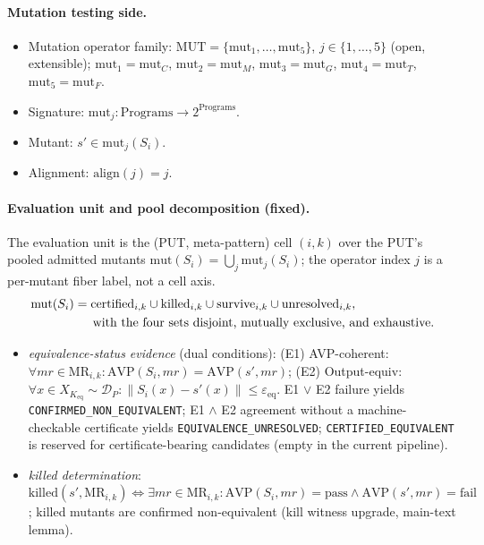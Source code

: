 \documentclass[manuscript,screen,review]{acmart}
\begin{document}
\paragraph{Mutation testing side.}
\begin{itemize}
\item Mutation operator family: $\mathrm{MUT} = \{\mathrm{mut}_1, \ldots, \mathrm{mut}_5\}$, $j \in \{1,\ldots,5\}$ (open, extensible); $\mathrm{mut}_1 = \mathrm{mut}_C$, $\mathrm{mut}_2 = \mathrm{mut}_M$, $\mathrm{mut}_3 = \mathrm{mut}_G$, $\mathrm{mut}_4 = \mathrm{mut}_T$, $\mathrm{mut}_5 = \mathrm{mut}_F$.
\item Signature: $\mathrm{mut}_j : \text{Programs} \to 2^{\text{Programs}}$.
\item Mutant: $s' \in \mathrm{mut}_j(S_i)$.
\item Alignment: $\mathrm{align}(j) = j$.
\end{itemize}

\paragraph{Evaluation unit and pool decomposition (fixed).}
The evaluation unit is the (PUT, meta-pattern) cell $(i,k)$ over the
PUT's pooled admitted mutants
$\mathrm{mut}(S_i) = \bigcup_j \mathrm{mut}_j(S_i)$; the operator index
$j$ is a per-mutant fiber label, not a cell axis.
\[
\begin{aligned}
\mathrm{mut}(S_i)
  &= \mathrm{certified}_{i,k} \cup \mathrm{killed}_{i,k}
     \cup \mathrm{survive}_{i,k} \cup \mathrm{unresolved}_{i,k},\\
&\hspace{1.5em}\text{with the four sets disjoint, mutually exclusive, and exhaustive.}
\end{aligned}
\]
\begin{itemize}
\item \emph{equivalence-status evidence} (dual conditions):
  (E1) AVP-coherent: $\forall \mathit{mr} \in \mathrm{MR}_{i,k}: \mathrm{AVP}(S_i, \mathit{mr}) = \mathrm{AVP}(s', \mathit{mr})$;
  (E2) Output-equiv: $\forall x \in X_{K_{\mathrm{eq}}} \sim \mathcal{D}_P: \|S_i(x) - s'(x)\| \leq \varepsilon_{\mathrm{eq}}$.
  E1 $\vee$ E2 failure yields \texttt{CONFIRMED\_NON\_EQUIVALENT}; E1
  $\wedge$ E2 agreement without a machine-checkable certificate yields
  \texttt{EQUIVALENCE\_UNRESOLVED}; \texttt{CERTIFIED\_EQUIVALENT} is
  reserved for certificate-bearing candidates (empty in the current
  pipeline).
\item \emph{killed determination}: $\mathrm{killed}(s', \mathrm{MR}_{i,k}) \Leftrightarrow \exists \mathit{mr} \in \mathrm{MR}_{i,k}: \mathrm{AVP}(S_i, \mathit{mr}) = \text{pass} \wedge \mathrm{AVP}(s', \mathit{mr}) = \text{fail}$; killed mutants are confirmed non-equivalent (kill witness upgrade, main-text lemma).
\end{itemize}
\end{document}
